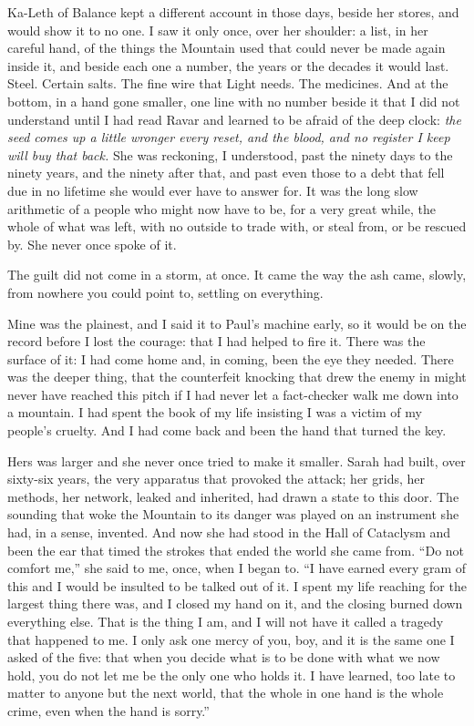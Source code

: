 Ka-Leth of Balance kept a different account in those days, beside her stores, and would show it to no one. I saw it only once, over her shoulder: a list, in her careful hand, of the things the Mountain used that could never be made again inside it, and beside each one a number, the years or the decades it would last. Steel. Certain salts. The fine wire that Light needs. The medicines. And at the bottom, in a hand gone smaller, one line with no number beside it that I did not understand until I had read Ravar and learned to be afraid of the deep clock: \emph{the seed comes up a little wronger every reset, and the blood, and no register I keep will buy that back.} She was reckoning, I understood, past the ninety days to the ninety years, and the ninety after that, and past even those to a debt that fell due in no lifetime she would ever have to answer for. It was the long slow arithmetic of a people who might now have to be, for a very great while, the whole of what was left, with no outside to trade with, or steal from, or be rescued by. She never once spoke of it.\par

\ornament

The guilt did not come in a storm, at once. It came the way the ash came, slowly, from nowhere you could point to, settling on everything.\par

Mine was the plainest, and I said it to Paul's machine early, so it would be on the record before I lost the courage: that I had helped to fire it. There was the surface of it: I had come home and, in coming, been the eye they needed. There was the deeper thing, that the counterfeit knocking that drew the enemy in might never have reached this pitch if I had never let a fact-checker walk me down into a mountain. I had spent the book of my life insisting I was a victim of my people's cruelty. And I had come back and been the hand that turned the key.\par

Hers was larger and she never once tried to make it smaller. Sarah had built, over sixty-six years, the very apparatus that provoked the attack; her grids, her methods, her network, leaked and inherited, had drawn a state to this door. The sounding that woke the Mountain to its danger was played on an instrument she had, in a sense, invented. And now she had stood in the Hall of Cataclysm and been the ear that timed the strokes that ended the world she came from. ``Do not comfort me,'' she said to me, once, when I began to. ``I have earned every gram of this and I would be insulted to be talked out of it. I spent my life reaching for the largest thing there was, and I closed my hand on it, and the closing burned down everything else. That is the thing I am, and I will not have it called a tragedy that happened to me. I only ask one mercy of you, boy, and it is the same one I asked of the five: that when you decide what is to be done with what we now hold, you do not let me be the only one who holds it. I have learned, too late to matter to anyone but the next world, that the whole in one hand is the whole crime, even when the hand is sorry.''\par

